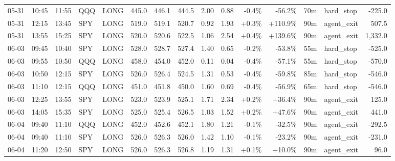 \documentclass[11pt,a4paper,twoside]{article}
\begin{document}
\begin{landscape}
\begin{center}
\begin{longtable}{>{\color{txtmain}}l l l l l r r r r r r r r >{\color{txtmain}}l r}
05-31 & 10:45 & 11:55 & QQQ & LONG & 445.0 & 446.1 & 444.5 & 2.00 & 0.88 & \textcolor{lossred}{-0.4\%} & \textcolor{lossred}{-56.2\%} & 70m & hard\_stop & \textcolor{lossred}{-225.0} \\
05-31 & 12:15 & 13:45 & SPY & LONG & 519.0 & 519.1 & 520.7 & 0.92 & 1.93 & \textcolor{wingreen}{+0.3\%} & \textcolor{wingreen}{+110.9\%} & 90m & agent\_exit & \textcolor{wingreen}{507.5} \\
05-31 & 13:55 & 15:25 & SPY & LONG & 520.0 & 520.6 & 522.5 & 1.06 & 2.54 & \textcolor{wingreen}{+0.4\%} & \textcolor{wingreen}{+139.6\%} & 90m & agent\_exit & \textcolor{wingreen}{1,332.0} \\
06-03 & 09:45 & 10:40 & SPY & LONG & 528.0 & 528.7 & 527.4 & 1.40 & 0.65 & \textcolor{lossred}{-0.2\%} & \textcolor{lossred}{-53.8\%} & 55m & hard\_stop & \textcolor{lossred}{-525.0} \\
06-03 & 09:55 & 10:50 & QQQ & LONG & 458.0 & 454.0 & 452.0 & 0.11 & 0.04 & \textcolor{lossred}{-0.4\%} & \textcolor{lossred}{-57.1\%} & 55m & hard\_stop & \textcolor{lossred}{-570.0} \\
06-03 & 10:50 & 12:15 & SPY & LONG & 526.0 & 526.4 & 524.5 & 1.31 & 0.53 & \textcolor{lossred}{-0.4\%} & \textcolor{lossred}{-59.8\%} & 85m & hard\_stop & \textcolor{lossred}{-546.0} \\
06-03 & 11:10 & 12:15 & QQQ & LONG & 451.0 & 451.8 & 450.0 & 1.60 & 0.69 & \textcolor{lossred}{-0.4\%} & \textcolor{lossred}{-56.9\%} & 65m & hard\_stop & \textcolor{lossred}{-546.0} \\
06-03 & 12:25 & 13:55 & SPY & LONG & 523.0 & 523.9 & 525.1 & 1.71 & 2.34 & \textcolor{wingreen}{+0.2\%} & \textcolor{wingreen}{+36.4\%} & 90m & agent\_exit & \textcolor{wingreen}{125.0} \\
06-03 & 14:05 & 15:35 & SPY & LONG & 525.0 & 525.4 & 526.5 & 1.03 & 1.52 & \textcolor{wingreen}{+0.2\%} & \textcolor{wingreen}{+47.6\%} & 90m & agent\_exit & \textcolor{wingreen}{441.0} \\
06-04 & 09:40 & 11:10 & QQQ & LONG & 452.0 & 452.6 & 452.1 & 1.80 & 1.21 & \textcolor{lossred}{-0.1\%} & \textcolor{lossred}{-32.5\%} & 90m & agent\_exit & \textcolor{lossred}{-292.5} \\
06-04 & 09:40 & 11:10 & SPY & LONG & 526.0 & 526.3 & 526.0 & 1.42 & 1.10 & \textcolor{lossred}{-0.1\%} & \textcolor{lossred}{-23.2\%} & 90m & agent\_exit & \textcolor{lossred}{-231.0} \\
06-04 & 11:20 & 12:50 & SPY & LONG & 526.0 & 526.3 & 526.8 & 1.19 & 1.31 & \textcolor{wingreen}{+0.1\%} & \textcolor{wingreen}{+10.0\%} & 90m & agent\_exit & \textcolor{wingreen}{96.0} \\

\end{longtable}
\end{center}
\end{landscape}
\end{document}
